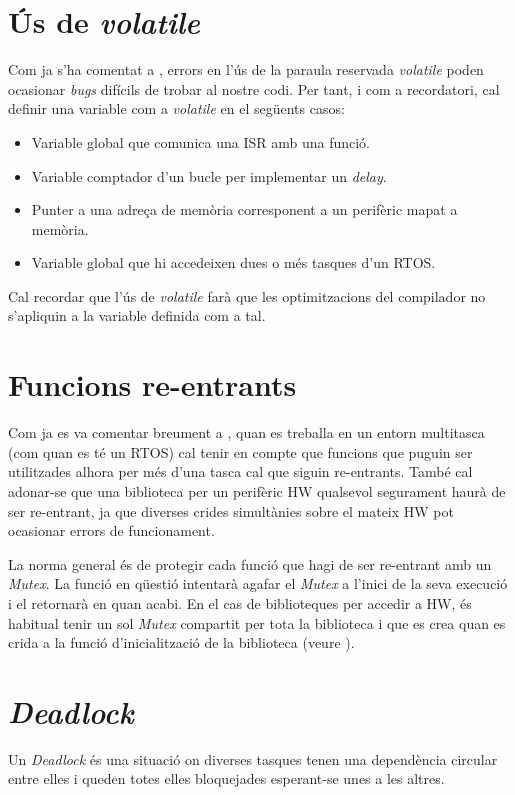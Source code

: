 \section{Ús de {\em volatile}}
Com ja s'ha comentat a , errors en l'ús de la paraula reservada {\em volatile} poden ocasionar {\em bugs} difícils de trobar al nostre codi. Per tant, i com a recordatori, cal definir una variable com a {\em volatile} en el següents casos:
\begin{itemize}
 \item Variable global que comunica una ISR amb una funció.
 \item Variable comptador d'un bucle per implementar un {\em delay}.
 \item Punter a una adreça de memòria corresponent a un perifèric mapat a memòria.
 \item Variable global que hi accedeixen dues o més tasques d'un RTOS.
\end{itemize}

Cal recordar que l'ús de {\em volatile} farà que les optimitzacions del compilador no s'apliquin a la variable definida com a tal.

\section{Funcions re-entrants}
Com ja es va comentar breument a , quan es treballa en un entorn multitasca (com quan es té un RTOS) cal tenir en compte que funcions que puguin ser utilitzades alhora per més d'una tasca cal que siguin re-entrants. També cal adonar-se que una biblioteca per un perifèric HW qualsevol segurament haurà de ser re-entrant, ja que diverses crides simultànies sobre el mateix HW pot ocasionar errors de funcionament.

La norma general és de protegir cada funció que hagi de ser re-entrant amb un {\em Mutex}. La funció en qüestió intentarà agafar el {\em Mutex} a l'inici de la seva execució i el retornarà en quan acabi. En el cas de biblioteques per accedir a HW, és habitual tenir un sol {\em Mutex} compartit per tota la biblioteca i que es crea quan es crida a la funció d'inicialització de la biblioteca (veure ).

\section{\em Deadlock}
Un {\em Deadlock} és una situació on diverses tasques tenen una dependència circular entre elles i queden totes elles bloquejades esperant-se unes a les altres.

